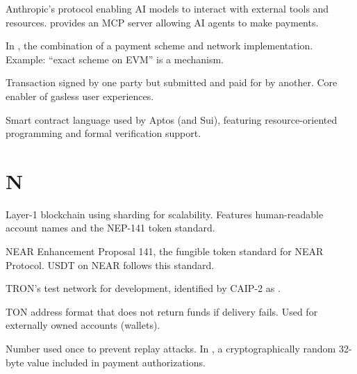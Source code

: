 \begin{description}[style=nextline]

\item[MCP (Model Context Protocol)]
Anthropic's protocol enabling AI models to interact with external tools and resources. \tprotocol{} provides an MCP server allowing AI agents to make payments.

\item[Mechanism]
In \tprotocol{}, the combination of a payment scheme and network implementation. Example: ``exact scheme on EVM'' is a mechanism.

\item[Meta-transaction]
Transaction signed by one party but submitted and paid for by another. Core enabler of gasless user experiences.

\item[Move]
Smart contract language used by Aptos (and Sui), featuring resource-oriented programming and formal verification support.

\end{description}

\section*{N}

\begin{description}[style=nextline]

\item[NEAR]
Layer-1 blockchain using sharding for scalability. Features human-readable account names and the NEP-141 token standard.

\item[NEP-141]
NEAR Enhancement Proposal 141, the fungible token standard for NEAR Protocol. USDT on NEAR follows this standard.

\item[Nile Testnet]
TRON's test network for development, identified by CAIP-2 as .

\item[Non-bounceable Address]
TON address format that does not return funds if delivery fails. Used for externally owned accounts (wallets).

\item[Nonce]
Number used once to prevent replay attacks. In \tprotocol{}, a cryptographically random 32-byte value included in payment authorizations.

\end{description}

